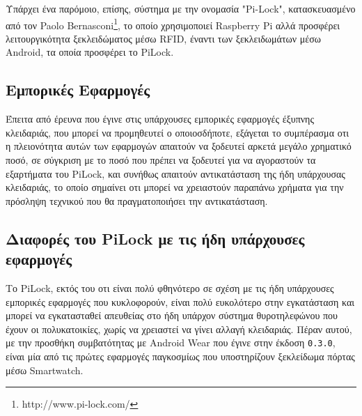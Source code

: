 		Υπάρχει ένα παρόμοιο, επίσης, σύστημα με την ονομασία "Pi-Lock", κατασκευασμένο από τον Paolo Bernasconi\footnote{http://www.pi-lock.com/}, το οποίο χρησιμοποιεί Raspberry Pi αλλά προσφέρει λειτουργικότητα ξεκλειδώματος μέσω RFID, έναντι των ξεκλειδωμάτων μέσω Android, τα οποία προσφέρει το PiLock.

	\subsection{Εμπορικές Εφαρμογές}
		Έπειτα από έρευνα που έγινε στις υπάρχουσες εμπορικές εφαρμογές έξυπνης κλειδαριάς, που μπορεί να προμηθευτεί ο οποιοσδήποτε, εξάγεται το συμπέρασμα οτι η πλειονότητα αυτών των εφαρμογών απαιτούν να ξοδευτεί αρκετά μεγάλο χρηματικό ποσό, σε σύγκριση με το ποσό που πρέπει να ξοδευτεί για να αγοραστούν τα εξαρτήματα του PiLock, και συνήθως απαιτούν αντικατάσταση της ήδη υπάρχουσας κλειδαριάς, το οποίο σημαίνει οτι μπορεί να χρειαστούν παραπάνω χρήματα για την πρόσληψη τεχνικού που θα πραγματοποιήσει την αντικατάσταση.

	\subsection{Διαφορές του PiLock με τις ήδη υπάρχουσες εφαρμογές}
		Το PiLock, εκτός του οτι είναι πολύ φθηνότερο σε σχέση με τις ήδη υπάρχουσες εμπορικές εφαρμογές που κυκλοφορούν, είναι πολύ ευκολότερο στην εγκατάσταση και μπορεί να εγκατασταθεί απευθείας στο ήδη υπάρχον σύστημα θυροτηλεφώνου που έχουν οι πολυκατοικίες, χωρίς να χρειαστεί να γίνει αλλαγή κλειδαριάς. Πέραν αυτού, με την προσθήκη συμβατότητας με Android Wear που έγινε στην έκδοση \verb|0.3.0|, είναι μία από τις πρώτες εφαρμογές παγκοσμίως που υποστηρίζουν ξεκλείδωμα πόρτας μέσω Smartwatch.